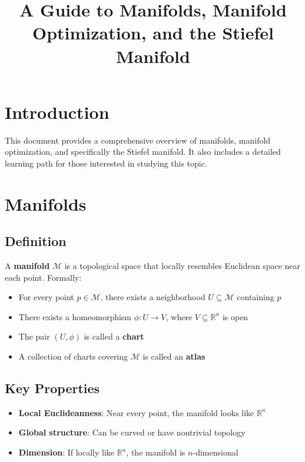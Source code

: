 \documentclass[11pt]{article}
\title{A Guide to Manifolds, Manifold Optimization, and the Stiefel Manifold}
\author{}
\date{}
\begin{document}
\maketitle

\tableofcontents

\section{Introduction}
This document provides a comprehensive overview of manifolds, manifold optimization, and specifically the Stiefel manifold. It also includes a detailed learning path for those interested in studying this topic.

\section{Manifolds}

\subsection{Definition}
A \textbf{manifold} $\mathcal{M}$ is a topological space that locally resembles Euclidean space near each point. Formally:

\begin{itemize}
    \item For every point $p \in \mathcal{M}$, there exists a neighborhood $U \subseteq \mathcal{M}$ containing $p$
    \item There exists a homeomorphism $\phi: U \to V$, where $V \subseteq \mathbb{R}^n$ is open
    \item The pair $(U, \phi)$ is called a \textbf{chart}
    \item A collection of charts covering $\mathcal{M}$ is called an \textbf{atlas}
\end{itemize}

\subsection{Key Properties}
\begin{itemize}
    \item \textbf{Local Euclideanness}: Near every point, the manifold looks like $\mathbb{R}^n$
    \item \textbf{Global structure}: Can be curved or have nontrivial topology
    \item \textbf{Dimension}: If locally like $\mathbb{R}^n$, the manifold is $n$-dimensional
\end{itemize}
\end{document}
